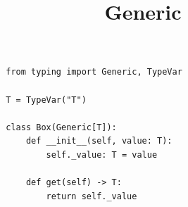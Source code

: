 \documentclass[a4paper]{article}
\title{Generic}
\date{}
\begin{document}
    \maketitle
    \begin{verbatim}
        from typing import Generic, TypeVar

        T = TypeVar("T")
        
        class Box(Generic[T]):
            def __init__(self, value: T):
                self._value: T = value
        
            def get(self) -> T:
                return self._value
    \end{verbatim}
\end{document}
